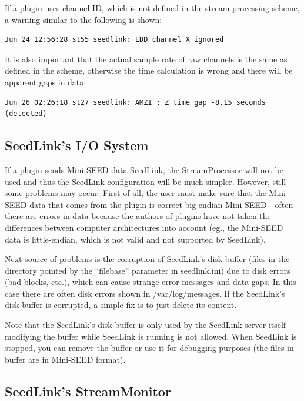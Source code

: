 \documentclass[11pt,a4paper,titlepage]{article}
\begin{document}
If a plugin uses channel ID, which is not defined in the stream processing
scheme, a warning similar to the following is shown:

\begin{verbatim}
Jun 24 12:56:28 st55 seedlink: EDD channel X ignored
\end{verbatim}

It is also important that the actual sample rate of raw channels is the
same as defined in the scheme, otherwise the time calculation is wrong and
there will be apparent gaps in data:

\begin{verbatim}
Jun 26 02:26:18 st27 seedlink: AMZI : Z time gap -8.15 seconds (detected)
\end{verbatim}


\subsection{SeedLink's I/O System}

If a plugin sends Mini-SEED data SeedLink, the StreamProcessor will not be
used and thus the SeedLink configuration will be much simpler. However,
still some problems may occur. First of all, the user must make sure that
the Mini-SEED data that comes from the plugin is correct big-endian
Mini-SEED---often there are errors in data because the authors of plugins
have not taken the differences between computer architectures into account
(eg., the Mini-SEED data is little-endian, which is not valid and not
supported by SeedLink).

Next source of problems is the corruption of SeedLink's disk buffer (files
in the directory pointed by the ``filebase'' parameter in seedlink.ini) due
to disk errors (bad blocks, etc.), which can cause strange error messages
and data gaps. In this case there are often disk errors shown in
/var/log/messages. If the SeedLink's disk buffer is corrupted, a simple fix
is to just delete its content.

Note that the SeedLink's disk buffer is only used by the SeedLink server
itself---modifying the buffer while SeedLink is running is not allowed.
When SeedLink is stopped, you can remove the buffer or use it for debugging
purposes (the files in buffer are in Mini-SEED format).


\subsection{SeedLink's StreamMonitor}
\end{document}
